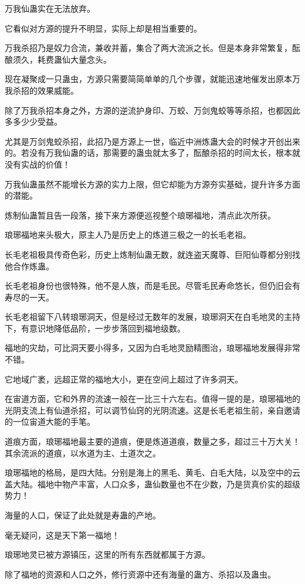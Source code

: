 \begin{this_body}
万我仙蛊实在无法放弃。

它看似对方源的提升不明显，实际上却是相当重要的。

万我杀招乃是奴力合流，兼收并蓄，集合了两大流派之长。但是本身非常繁复，酝酿须久，耗费蛊仙大量念头。

现在凝聚成一只蛊虫，方源只需要简简单单的几个步骤，就能迅速地催发出原本万我杀招的效果威能。

除了万我杀招本身之外，方源的逆流护身印、万蛟、万剑鬼蛟等等杀招，也都因此多多少少受益。

尤其是万剑鬼蛟杀招，此招乃是方源上一世，临近中洲炼蛊大会的时候才开创出来的。若没有万我仙蛊的话，那需要的蛊虫就太多了，酝酿杀招的时间太长，根本就没有实战的价值！

万我仙蛊虽然不能增长方源的实力上限，但它却能为方源夯实基础，提升许多方面的潜能。

炼制仙蛊暂且告一段落，接下来方源便巡视整个琅琊福地，清点此次所获。

琅琊福地来头极大，原主人乃是历史上的炼道三极之一的长毛老祖。

长毛老祖极具传奇色彩，历史上炼制仙蛊无数，就连盗天魔尊、巨阳仙尊都分别找他合作炼蛊。

长毛老祖身份也很特殊，他不是人族，而是毛民。尽管毛民寿命悠长，但仍旧会有寿尽的一天。

长毛老祖留下八转琅琊洞天，但是经过无数年的发展，琅琊洞天在白毛地灵的主持下，有意识地降低品阶，一步步落回到福地级数。

福地的灾劫，可比洞天要小得多，又因为白毛地灵励精图治，琅琊福地发展得非常不错。

它地域广袤，远超正常的福地大小，更在空间上超过了许多洞天。

在宙道方面，它和外界的流速一般在一比三十六左右。值得一提的是，琅琊福地的光阴支流上有仙道杀招，可以调节仙窍的光阴流速。这是长毛老祖生前，亲自邀请的一位宙道大能的手笔。

道痕方面，琅琊福地最主要的道痕，便是炼道道痕，数量之多，超过三十万大关！其余流派的道痕，以水道为主、土道次之。

琅琊福地的格局，是四大陆。分别是海上的黑毛、黄毛、白毛大陆，以及空中的云盖大陆。福地中物产丰富，人口众多，蛊仙数量也不在少数，乃是货真价实的超级势力！

海量的人口，保证了此处就是寿蛊的产地。

毫无疑问，这是天下第一福地！

琅琊地灵已被方源镇压，这里的所有东西就都属于方源。

除了福地的资源和人口之外，修行资源中还有海量的蛊方、杀招以及蛊虫。


\end{this_body}
